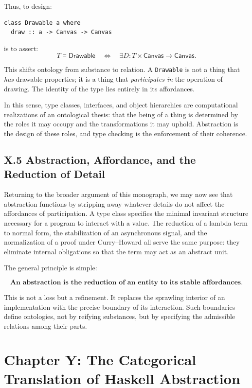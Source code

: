 \documentclass[12pt,letterpaper]{article}
\begin{document}
Thus, to design:
\begin{verbatim}
class Drawable a where
  draw :: a -> Canvas -> Canvas
\end{verbatim}
is to assert:
\[
T \vDash \mathsf{Drawable} 
\quad \iff \quad 
\exists D : T \times \mathsf{Canvas} \to \mathsf{Canvas}.
\]

This shifts ontology from substance to relation. A \texttt{Drawable} is not a thing that \emph{has} drawable properties; it is a thing that \emph{participates in} the operation of drawing. The identity of the type lies entirely in its affordances.

In this sense, type classes, interfaces, and object hierarchies are computational realizations of an ontological thesis: that the being of a thing is determined by the roles it may occupy and the transformations it may uphold. Abstraction is the design of these roles, and type checking is the enforcement of their coherence.

\subsection{X.5 Abstraction, Affordance, and the Reduction of Detail}

Returning to the broader argument of this monograph, we may now see that abstraction functions by stripping away whatever details do not affect the affordances of participation. A type class specifies the minimal invariant structure necessary for a program to interact with a value. The reduction of a lambda term to normal form, the stabilization of an asynchronous signal, and the normalization of a proof under Curry--Howard all serve the same purpose: they eliminate internal obligations so that the term may act as an abstract unit.

The general principle is simple:

\[
\textbf{An abstraction is the reduction of an entity to its stable affordances.}
\]

This is not a loss but a refinement. It replaces the sprawling interior of an implementation with the precise boundary of its interaction. Such boundaries define ontologies, not by reifying substances, but by specifying the admissible relations among their parts.

\newpage

\section{Chapter Y: The Categorical Translation of Haskell Abstraction}
\end{document}
